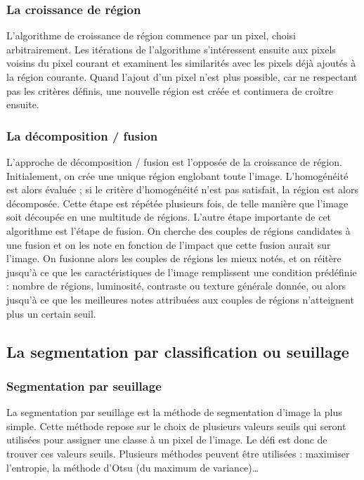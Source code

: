 	\subsubsection{La croissance de région}
		L'algorithme de croissance de région commence par un pixel, choisi arbitrairement. Les itérations de l'algorithme s'intéressent ensuite aux pixels voisins du pixel courant et examinent les similarités avec les pixels déjà ajoutés à la région courante. Quand l'ajout d'un pixel n'est plus possible, car ne respectant pas les critères définis, une nouvelle région est créée et continuera de croître ensuite.\cite{spatialSegmentation}
	
	\subsubsection{La décomposition / fusion}
		L'approche de décomposition / fusion est l'opposée de la croissance de région. Initialement, on crée une unique région englobant toute l'image. L'homogénéité est alors évaluée ; si le critère d'homogénéité n'est pas satisfait, la région est alors décomposée. Cette étape est répétée plusieurs fois, de telle manière que l'image soit découpée en une multitude de régions. L'autre étape importante de cet algorithme est l'étape de fusion. On cherche des couples de régions candidates à une fusion et on les note en fonction de l'impact que cette fusion aurait sur l'image. On fusionne alors les couples de régions les mieux notés, et on réitère jusqu’à ce que les caractéristiques de l'image remplissent une condition prédéfinie : nombre de régions, luminosité, contraste ou texture générale donnée, ou alors jusqu’à ce que les meilleures notes attribuées aux couples de régions n'atteignent plus un certain seuil.

\subsection{La segmentation par classification ou seuillage}
	\subsubsection{Segmentation par seuillage}
		La segmentation par seuillage est la méthode de segmentation d'image la plus simple. Cette méthode repose sur le choix de plusieurs valeurs seuils qui seront utilisées pour assigner une classe à un pixel de l'image. Le défi est donc de trouver ces valeurs seuils. Plusieurs méthodes peuvent être utilisées : maximiser l'entropie, la méthode d'Otsu (du maximum de variance)\dots

